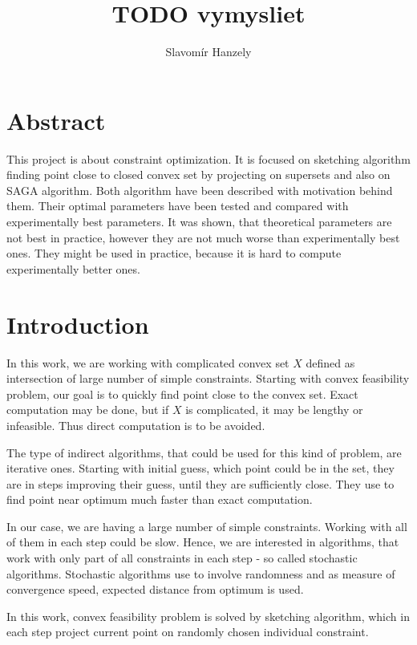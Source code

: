 \documentclass[11pt]{book}
\begin{document}
\title{\textbf{TODO vymysliet}}
\author{Slavomír Hanzely}
\maketitle

\chapter*{\centering Abstract}

This project is about constraint optimization. It is focused on sketching algorithm finding point close to closed convex set by projecting on supersets and also on SAGA algorithm. Both algorithm have been described with motivation behind them. Their optimal parameters have been tested and compared with experimentally best parameters. It was shown, that theoretical parameters are not best in practice, however they are not much worse than experimentally best ones. They might be used in practice, because it is hard to compute experimentally better ones.

\tableofcontents

\chapter{Introduction}

In this work, we are working with complicated convex set $X$ defined as intersection of large number of simple constraints. Starting with convex feasibility problem, our goal is to quickly find point close to the convex set. Exact computation may be done, but if $X$ is complicated, it may be lengthy or infeasible. Thus direct computation is to be avoided.

The type of indirect algorithms, that could be used for this kind of problem, are iterative ones. Starting with initial guess, which point could be in the set, they are in steps improving their guess, until they are sufficiently close. They use to find point near optimum much faster than exact computation.

In our case, we are having a large number of simple constraints. Working with all of them in each step could be slow. Hence, we are interested in algorithms, that work with only part of all constraints in each step - so called stochastic algorithms. Stochastic algorithms use to involve randomness and as measure of convergence speed, expected distance from optimum is used.

In this work, convex feasibility problem is solved by sketching algorithm, which in each step project current point on randomly chosen individual constraint.\\
\end{document}
